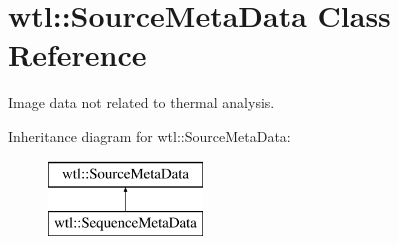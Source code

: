 \hypertarget{classwtl_1_1_source_meta_data}{}\section{wtl\+:\+:Source\+Meta\+Data Class Reference}
\label{classwtl_1_1_source_meta_data}


Image data not related to thermal analysis.  


Inheritance diagram for wtl\+:\+:Source\+Meta\+Data\+:\begin{figure}[H]
\begin{center}
\leavevmode
\includegraphics[height=2.000000cm]{classwtl_1_1_source_meta_data}
\end{center}
\end{figure}
